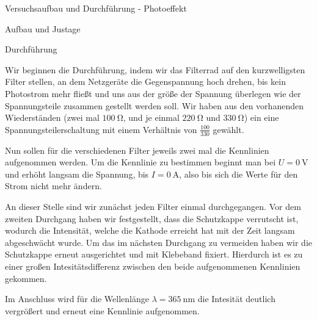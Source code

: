 \documentclass[pdftex, a4paper,11pt, twoside, ngerman]{report}
\begin{document}
\begin{chapter}{Versuchsaufbau und Durchführung - Photoeffekt}
\begin{section}{Aufbau und Justage}

      \begin{section}{Durchführung}
	\label{chp:Aufbau:sec:ERSTERTEIL:subsec:UNTERTEIL}
       
       Wir beginnen die Durchführung, indem wir das Filterrad auf den kurzwelligsten Filter stellen, an dem Netzgeräte die Gegenspannung hoch drehen, bis kein Photostrom mehr fließt und uns aus der größe der Spannung überlegen wie der Spannungsteile zusammen gestellt werden soll.
       Wir haben aus den vorhanenden Wiederständen (zwei mal $\SI{100}{\ohm}$, und je einmal $\SI{220}{\ohm}$ und $\SI{330}{\ohm}$) ein eine Spannungsteilerschaltung mit einem Verhältnis von $\frac{100}{330}$ gewählt.

       Nun sollen für die verschiedenen Filter jeweils zwei mal die Kennlinien aufgenommen werden.
       Um die Kennlinie zu bestimmen beginnt man bei $U=\SI{0}{\volt}$ und erhöht langsam die Spannung, bis $I=\SI{0}{\ampere}$, also bis sich die Werte für den Strom nicht mehr ändern.

       An dieser Stelle sind wir zunächst jeden Filter einmal durchgegangen.
       Vor dem zweiten Durchgang haben wir festgestellt, dass die Schutzkappe verrutscht ist, wodurch die Intensität, welche die Kathode erreicht hat mit der Zeit langsam abgeschwächt wurde.
       Um das im nächsten Durchgang zu vermeiden haben wir die Schutzkappe erneut ausgerichtet und mit Klebeband fixiert.
       Hierdurch ist es zu einer großen Intesitätsdifferenz zwischen den beide aufgenommenen Kennlinien gekommen.

       Im Anschluss wird für die Wellenlänge $\lambda = \SI{365}{\nano\meter}$ die Intesität deutlich vergrößert und erneut eine Kennlinie aufgenommen.  
       
      \end{section}
      
      
    \end{section}
    
  \end{chapter}
  
\end{document}
